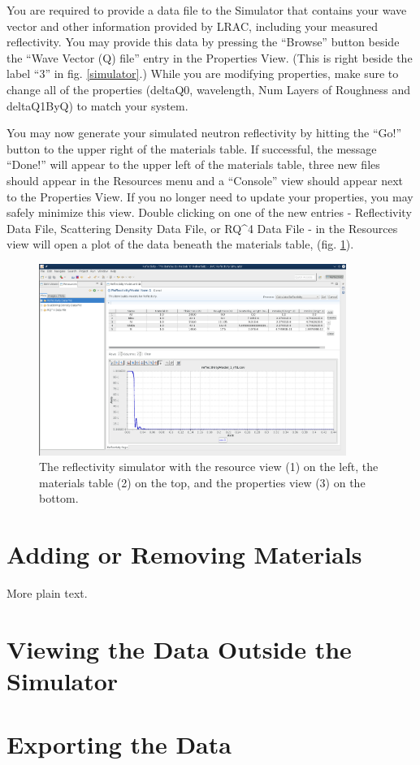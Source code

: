 \documentclass{article}
\begin{document}
You are required to provide a data file to the Simulator that contains your wave
vector and other information provided by LRAC, including your measured
reflectivity. You may provide this data by pressing the ``Browse'' button beside
the ``Wave Vector (Q) file'' entry in the Properties View. (This is right beside
the label ``3'' in fig. \ref{simulator}.) While you are modifying properties,
make sure to change all of the properties (deltaQ0, wavelength, Num Layers of
Roughness and deltaQ1ByQ) to match your system.

You may now generate your simulated neutron reflectivity by hitting the ``Go!''
button to the upper right of the materials table. If successful, the message
``Done!'' will appear to the upper left of the materials table, three new files
should appear in the Resources menu and a ``Console'' view should appear next to
the Properties View. If you no longer need to update your properties, you may
safely minimize this view. Double clicking on one of the new entries -
Reflectivity Data File, Scattering Density Data File, or RQ^4 Data File - in the
Resources view will open a plot of the data beneath the materials table, (fig.
\ref{simulatorPost}).

\begin{figure}[!h]
\centering
\includegraphics[width=10cm]{images/simulatorProcessed.png}
\caption{The reflectivity simulator with the resource view (1) on the left, the
materials table (2) on the top, and the properties view (3) on the bottom.}
\label{simulatorPost}
\end{figure}


\section{Adding or Removing Materials}
\label{modifyMaterials}

More plain text.

\section{Viewing the Data Outside the Simulator}
\label{viz}

\section{Exporting the Data}
\label{export}
\end{document}
